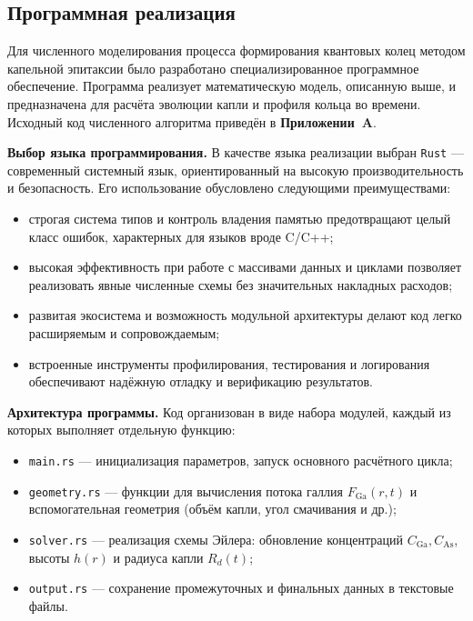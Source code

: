 \documentclass[14pt,oneside]{extarticle}
\begin{document}
\subsection{Программная реализация}

Для численного моделирования процесса формирования квантовых колец методом капельной эпитаксии было разработано специализированное программное обеспечение. Программа реализует математическую модель, описанную выше, и предназначена для расчёта эволюции капли и профиля кольца во времени. Исходный код численного алгоритма приведён в \textbf{Приложении~A}.

\textbf{Выбор языка программирования.} В качестве языка реализации выбран \texttt{Rust} — современный системный язык, ориентированный на высокую производительность и безопасность. Его использование обусловлено следующими преимуществами:

\begin{itemize}
    \item строгая система типов и контроль владения памятью предотвращают целый класс ошибок, характерных для языков вроде C/C++;
    \item высокая эффективность при работе с массивами данных и циклами позволяет реализовать явные численные схемы без значительных накладных расходов;
    \item развитая экосистема и возможность модульной архитектуры делают код легко расширяемым и сопровождаемым;
    \item встроенные инструменты профилирования, тестирования и логирования \\
    обеспечивают надёжную отладку и верификацию результатов.
\end{itemize}

\textbf{Архитектура программы.} Код организован в виде набора модулей, каждый из которых выполняет отдельную функцию:

\begin{itemize}
    \item \texttt{main.rs} — инициализация параметров, запуск основного расчётного цикла;
    \item \texttt{geometry.rs} — функции для вычисления потока галлия $F_{\mathrm{Ga}}(r, t)$ и вспомогательная геометрия (объём капли, угол смачивания и др.);
    \item \texttt{solver.rs} — реализация схемы Эйлера: обновление концентраций $C_{\mathrm{Ga}}, C_{\mathrm{As}}$, высоты $h(r)$ и радиуса капли $R_d(t)$;
    \item \texttt{output.rs} — сохранение промежуточных и финальных данных в текстовые файлы.
\end{itemize}
\end{document}
